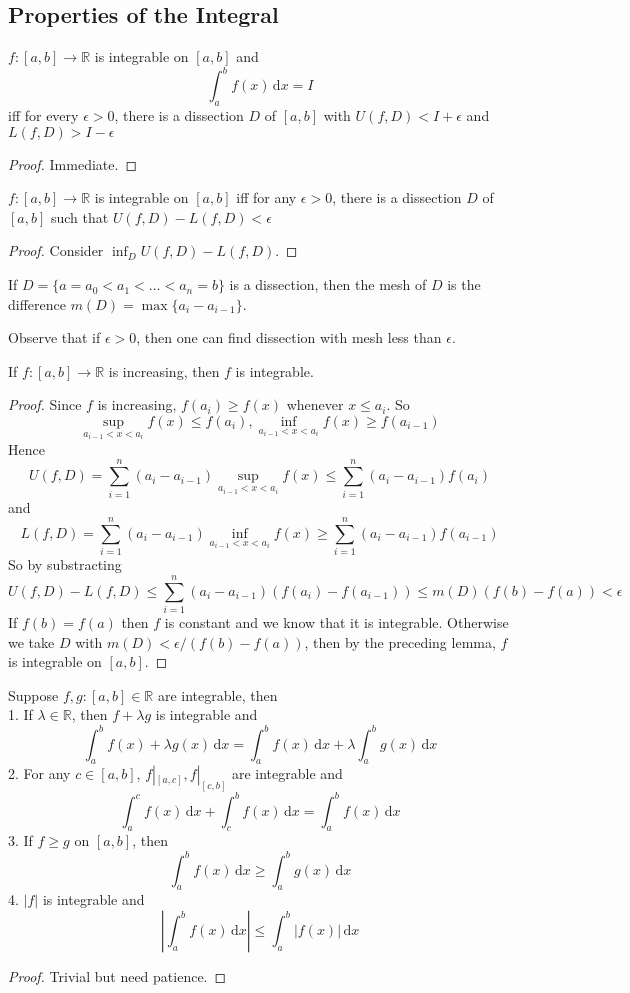 \subsection{Properties of the Integral}
\begin{proposition}
    $f:[a,b]\to\mathbb R$ is integrable on $[a,b]$ and
    $$\int_a^bf(x)\,\mathrm dx=I$$
    iff for every $\epsilon>0$, there is a dissection $D$ of $[a,b]$ with $U(f,D)< I+\epsilon$ and $L(f,D)>I-\epsilon$
\end{proposition}
\begin{proof}
    Immediate.
\end{proof}
\begin{proposition}
    $f:[a,b]\to\mathbb R$ is integrable on $[a,b]$ iff for any $\epsilon>0$, there is a dissection $D$ of $[a,b]$ such that $U(f,D)-L(f,D)<\epsilon$
\end{proposition}
\begin{proof}
    Consider $\inf_D U(f,D)-L(f,D)$.
\end{proof}
\begin{definition}
    If $D=\{a=a_0<a_1<\ldots<a_n=b\}$ is a dissection, then the mesh of $D$ is the difference $m(D)=\max\{a_i-a_{i-1}\}$.
\end{definition}
Observe that if $\epsilon>0$, then one can find dissection with mesh less than $\epsilon$.
\begin{theorem}
    If $f:[a,b]\to\mathbb R$ is increasing, then $f$ is integrable.
\end{theorem}
\begin{proof}
    Since $f$ is increasing, $f(a_i)\ge f(x)$ whenever $x\le a_i$.
    So
    $$\sup_{a_{i-1}<x<a_i}f(x)\le f(a_i),\inf_{a_{i-1}<x<a_i}f(x)\ge f(a_{i-1})$$
    Hence
    $$U(f,D)=\sum_{i=1}^n(a_i-a_{i-1})\sup_{a_{i-1}<x<a_i}f(x)\le\sum_{i=1}^n(a_i-a_{i-1})f(a_i)$$
    and
    $$L(f,D)=\sum_{i=1}^n(a_i-a_{i-1})\inf_{a_{i-1}<x<a_i}f(x)\ge\sum_{i=1}^n(a_i-a_{i-1})f(a_{i-1})$$
    So by substracting
    $$U(f,D)-L(f,D)\le \sum_{i=1}^n(a_i-a_{i-1})(f(a_i)-f(a_{i-1}))\le m(D)(f(b)-f(a))<\epsilon$$
    If $f(b)=f(a)$ then $f$ is constant and we know that it is integrable.
    Otherwise we take $D$ with $m(D)<\epsilon/(f(b)-f(a))$, then by the preceding lemma, $f$ is integrable on $[a,b]$.
\end{proof}
\begin{proposition}
    Suppose $f,g:[a,b]\in\mathbb R$ are integrable, then\\
    1. If $\lambda\in\mathbb R$, then $f+\lambda g$ is integrable and
    $$\int_a^bf(x)+\lambda g(x)\,\mathrm dx=\int_a^bf(x)\,\mathrm dx+\lambda\int_a^bg(x)\,\mathrm dx$$
    2. For any $c\in [a,b]$, $f|_{[a,c]},f|_{[c,b]}$ are integrable and
    $$\int_a^cf(x)\,\mathrm dx+\int_c^bf(x)\,\mathrm dx=\int_a^bf(x)\,\mathrm dx$$
    3. If $f\ge g$ on $[a,b]$, then
    $$\int_a^bf(x)\,\mathrm dx\ge\int_a^bg(x)\,\mathrm dx$$
    4. $|f|$ is integrable and
    $$\left|\int_a^bf(x)\,\mathrm dx\right|\le\int_a^b|f(x)|\,\mathrm dx$$
\end{proposition}
\begin{proof}
    Trivial but need patience.
\end{proof}
